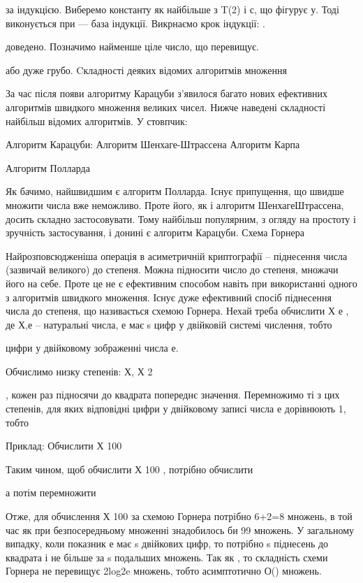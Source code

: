 за індукцією. Виберемо константу  як найбільше з T(2) і с, що фігурує у.
Тоді виконується при --- база індукції.
Викрнаємо крок індукції: .



доведено.
Позначимо  найменше ціле число, що перевищує.


або дуже грубо.
Cкладності деяких відомих алгоритмів множення

За час після появи алгоритму Карацуби з’явилося багато нових
ефективних алгоритмів швидкого множення великих чисел. Нижче наведені
складності найбільш відомих алгоритмів.
У стовпчик:


Алгоритм Карацуби:
Алгоритм Шенхаге-Штрассена
Алгоритм Карпа

Алгоритм Полларда

Як бачимо, найшвидшим є алгоритм Полларда. Існує припущення, що
швидше множити числа вже неможливо. Проте його, як і алгоритм ШенхагеШтрассена, досить складно застосовувати. Тому найбільш популярним, з
огляду на простоту і зручність застосування, і донині є алгоритм Карацуби.
Схема Горнера

Найрозповсюдженіша операція в асиметричній криптографії – піднесення
числа (зазвичай великого) до степеня. Можна підносити число до степеня,
множачи його на себе. Проте це не є ефективним способом навіть при
використанні одного з алгоритмів швидкого множення. Існує дуже ефективний
спосіб піднесення числа до степеня, що називається схемою Горнера. Нехай
треба обчислити Х е
, де Х,е – натуральні числа, е має s цифр у двійковій системі
числення, тобто


цифри у двійковому зображенні числа е.



Обчислимо низку степенів: Х, Х 2

, кожен раз
підносячи до квадрата попереднє значення. Перемножимо ті з цих степенів, для
яких відповідні цифри у двійковому записі числа е дорівнюють 1, тобто



Приклад:
Обчислити Х 100



Таким чином, щоб обчислити Х 100
, потрібно обчислити


а потім перемножити


Отже, для обчислення Х 100 за схемою Горнера потрібно 6+2=8
множень, в той час як при безпосередньому множенні знадобилось би 99
множень. У загальному випадку, коли показник е має s двійкових цифр, то
потрібно s піднесень до квадрата і не більше за s подальших множень. Так як
, то складність схеми Горнера не перевищує 2log2e множень, тобто
асимптотично О() множень.


